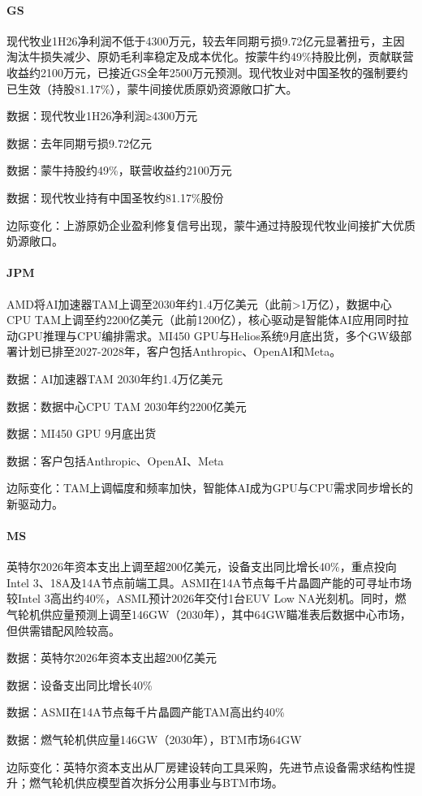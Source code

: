 \documentclass[11pt]{ctexart}
\begin{document}
\paragraph{GS} 现代牧业1H26净利润不低于4300万元，较去年同期亏损9.72亿元显著扭亏，主因淘汰牛损失减少、原奶毛利率稳定及成本优化。按蒙牛约49\%持股比例，贡献联营收益约2100万元，已接近GS全年2500万元预测。现代牧业对中国圣牧的强制要约已生效（持股81.17\%），蒙牛间接优质原奶资源敞口扩大。
{\small\color{refgray}数据：现代牧业1H26净利润≥4300万元\par}
{\small\color{refgray}数据：去年同期亏损9.72亿元\par}
{\small\color{refgray}数据：蒙牛持股约49\%，联营收益约2100万元\par}
{\small\color{refgray}数据：现代牧业持有中国圣牧约81.17\%股份\par}
{\small\color{refgray}边际变化：上游原奶企业盈利修复信号出现，蒙牛通过持股现代牧业间接扩大优质奶源敞口。\par}
\paragraph{JPM} AMD将AI加速器TAM上调至2030年约1.4万亿美元（此前>1万亿），数据中心CPU TAM上调至约2200亿美元（此前1200亿），核心驱动是智能体AI应用同时拉动GPU推理与CPU编排需求。MI450 GPU与Helios系统9月底出货，多个GW级部署计划已排至2027-2028年，客户包括Anthropic、OpenAI和Meta。
{\small\color{refgray}数据：AI加速器TAM 2030年约1.4万亿美元\par}
{\small\color{refgray}数据：数据中心CPU TAM 2030年约2200亿美元\par}
{\small\color{refgray}数据：MI450 GPU 9月底出货\par}
{\small\color{refgray}数据：客户包括Anthropic、OpenAI、Meta\par}
{\small\color{refgray}边际变化：TAM上调幅度和频率加快，智能体AI成为GPU与CPU需求同步增长的新驱动力。\par}
\paragraph{MS} 英特尔2026年资本支出上调至超200亿美元，设备支出同比增长40\%，重点投向Intel 3、18A及14A节点前端工具。ASMI在14A节点每千片晶圆产能的可寻址市场较Intel 3高出约40\%，ASML预计2026年交付1台EUV Low NA光刻机。同时，燃气轮机供应量预测上调至146GW（2030年），其中64GW瞄准表后数据中心市场，但供需错配风险较高。
{\small\color{refgray}数据：英特尔2026年资本支出超200亿美元\par}
{\small\color{refgray}数据：设备支出同比增长40\%\par}
{\small\color{refgray}数据：ASMI在14A节点每千片晶圆产能TAM高出约40\%\par}
{\small\color{refgray}数据：燃气轮机供应量146GW（2030年），BTM市场64GW\par}
{\small\color{refgray}边际变化：英特尔资本支出从厂房建设转向工具采购，先进节点设备需求结构性提升；燃气轮机供应模型首次拆分公用事业与BTM市场。\par}
\end{document}
